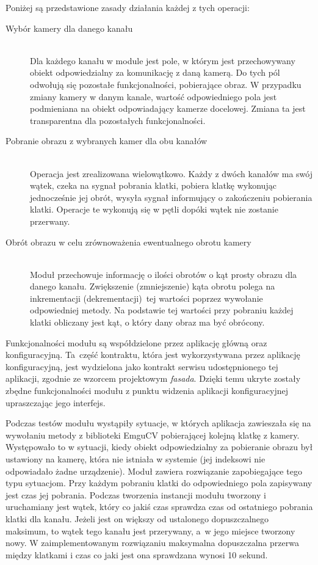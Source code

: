 \documentclass[a4paper,11pt,twoside]{report}
\theoremstyle{definition}
\begin{document}
Poniżej są przedstawione zasady działania każdej z tych operacji:
\begin{description}
\item [Wybór kamery dla danego kanału] \hfill \\
Dla każdego kanału w module jest pole, w którym jest przechowywany obiekt odpowiedzialny za komunikację z daną kamerą. Do tych pól odwołują się pozostałe funkcjonalności, pobierające obraz. W przypadku zmiany kamery w danym kanale, wartość odpowiedniego pola jest podmieniana na obiekt odpowiadający kamerze docelowej. Zmiana ta jest transparentna dla pozostałych funkcjonalności.
\item [Pobranie obrazu z wybranych kamer dla obu kanałów] \hfill \\
Operacja jest zrealizowana wielowątkowo. Każdy z dwóch kanałów ma swój wątek, czeka na sygnał pobrania klatki, pobiera klatkę wykonując jednocześnie jej obrót, wysyła sygnał informujący o zakończeniu pobierania klatki. Operacje te wykonują się w pętli dopóki wątek nie zostanie przerwany.
\item [Obrót obrazu w celu zrównoważenia ewentualnego obrotu kamery] \hfill \\
Moduł przechowuje informację o ilości obrotów o kąt prosty obrazu dla danego kanału. Zwiększenie (zmniejszenie) kąta obrotu polega na inkrementacji (dekrementacji)~tej wartości poprzez wywołanie odpowiedniej metody. Na podstawie tej wartości przy pobraniu każdej klatki obliczany jest kąt, o który dany obraz ma być obrócony.
\end{description}

Funkcjonalności modułu są współdzielone przez aplikację główną oraz konfiguracyjną. Ta~część kontraktu, która jest wykorzystywana przez aplikację konfiguracyjną, jest wydzielona jako kontrakt serwisu udostępnionego tej aplikacji, zgodnie ze wzorcem projektowym \textit{fasada}. Dzięki temu ukryte zostały zbędne funkcjonalności modułu z punktu widzenia aplikacji konfiguracyjnej upraszczając jego interfejs.

Podczas testów modułu wystąpiły sytuacje, w których aplikacja zawieszała się na wywołaniu metody z biblioteki EmguCV pobierającej kolejną klatkę z kamery. Występowało to w sytuacji, kiedy obiekt odpowiedzialny za pobieranie obrazu był ustawiony na kamerę, która nie istniała w systemie (jej indeksowi nie odpowiadało żadne urządzenie). Moduł zawiera rozwiązanie zapobiegające tego typu sytuacjom. Przy każdym pobraniu klatki do odpowiedniego pola zapisywany jest czas jej pobrania. Podczas tworzenia instancji modułu tworzony i uruchamiany jest wątek, który co jakiś czas sprawdza czas od ostatniego pobrania klatki dla kanału. Jeżeli jest on większy od ustalonego dopuszczalnego maksimum, to wątek tego kanału jest przerywany, a~w jego miejsce tworzony nowy. 
W zaimplementowanym rozwiązaniu maksymalna dopuszczalna przerwa między klatkami i czas co jaki jest ona sprawdzana wynosi 10 sekund.
\end{document}
